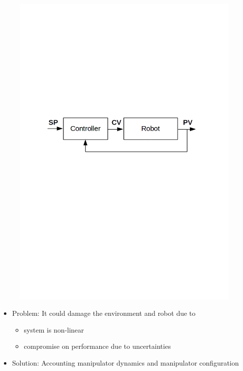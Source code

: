 \documentclass{beamer}
\begin{document}
\begin{frame}
\begin{figure}
\begin{minipage}{.45\textwidth}
  \includegraphics[trim=0 400 0 400,width=1.3\linewidth]{images/controlonly}
\end{minipage}
\end{figure}		
	\begin{itemize} 
	\item Problem: It could damage the environment and robot due to 
	\begin{itemize}
	\item system is non-linear
	\item compromise on performance due to uncertainties
	\end{itemize}
\pause
	\item Solution: Accounting manipulator dynamics and manipulator configuration
	\end{itemize}
\end{frame}
\end{document}
